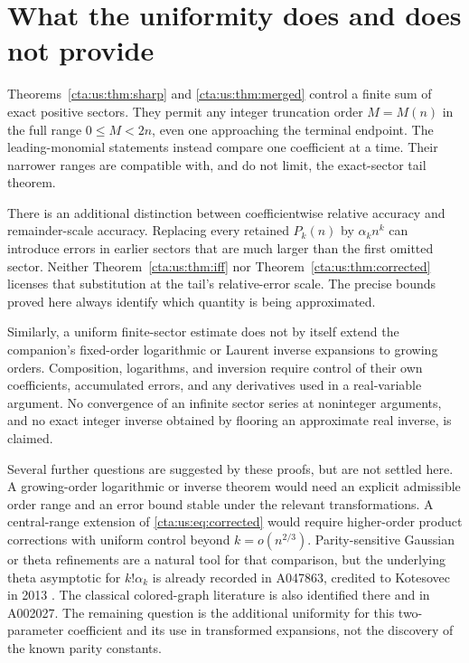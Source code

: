 \documentclass[11pt]{article}
\theoremstyle{definition}
\theoremstyle{remark}
\begin{document}
\section{What the uniformity does and does not provide}\label{cta:us:sec:scope}

Theorems~\ref{cta:us:thm:sharp} and \ref{cta:us:thm:merged} control a finite sum
of exact positive sectors. They permit any integer truncation order
$M=M(n)$ in the full range $0\le M<2n$, even one approaching the
terminal endpoint. The leading-monomial statements instead compare
one coefficient at a time. Their narrower ranges are compatible with,
and do not limit, the exact-sector tail theorem.

There is an additional distinction between coefficientwise relative
accuracy and remainder-scale accuracy. Replacing every retained
$P_k(n)$ by $\alpha_kn^k$ can introduce errors in earlier sectors
that are much larger than the first omitted sector. Neither
Theorem~\ref{cta:us:thm:iff} nor Theorem~\ref{cta:us:thm:corrected} licenses that
substitution at the tail's relative-error scale. The precise bounds
proved here always identify which quantity is being approximated.

Similarly, a uniform finite-sector estimate does not by itself extend
the companion's fixed-order logarithmic or Laurent inverse expansions
to growing orders. Composition, logarithms, and inversion require
control of their own coefficients, accumulated errors, and any
derivatives used in a real-variable argument. No convergence of an
infinite sector series at noninteger arguments, and no exact integer
inverse obtained by flooring an approximate real inverse, is claimed.

Several further questions are suggested by these proofs, but are not
settled here. A growing-order logarithmic or inverse theorem would need
an explicit admissible order range and an error bound stable under the
relevant transformations. A central-range extension of
\eqref{cta:us:eq:corrected} would require higher-order product corrections
with uniform control beyond $k=o(n^{2/3})$. Parity-sensitive Gaussian
or theta refinements are a natural tool for that comparison, but the
underlying theta asymptotic for $k!\alpha_k$ is already recorded in
A047863, credited to Kotesovec in 2013 \cite{colored}. The classical
colored-graph literature is also identified there and in A002027.
The remaining question is the additional uniformity for this
two-parameter coefficient and its use in transformed expansions,
not the discovery of the known parity constants.
\end{document}
